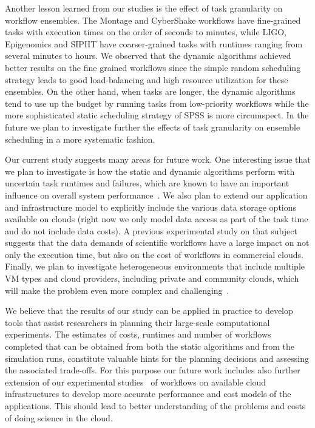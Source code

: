 \documentclass[conference]{IEEEtran}
\begin{document}
Another lesson learned from our studies is the effect of task granularity on
workflow ensembles. The Montage and CyberShake workflows have fine-grained tasks
with execution times on the order of seconds to minutes, while LIGO, Epigenomics
and SIPHT have coarser-grained tasks with runtimes ranging from several minutes
to hours. We observed that the dynamic algorithms achieved better results on the
fine grained workflows since the simple random scheduling strategy leads to good
load-balancing and high resource utilization for these ensembles. On the other
hand, when tasks are longer, the dynamic algorithms tend to use up the budget by
running tasks from low-priority workflows while the more sophisticated static
scheduling strategy of SPSS is more circumspect. In the future we plan to
investigate further the effects of task granularity on ensemble scheduling in a more
systematic fashion.

Our current study suggests many areas for future work. One interesting
issue that we plan to investigate is how the static and dynamic algorithms 
perform with uncertain task runtimes and failures, which are known to have 
an important influence on overall system performance~\cite{Sakellariou2010,Dongarra2007}. 
We also plan to extend our application and infrastructure model to explicitly 
include the various data storage options available on clouds (right now we only 
model data access as part of the task time and do not include data costs). A previous 
experimental study on that subject~\cite{Juve2010} suggests that the data 
demands of scientific workflows have a large impact on not only the 
execution time, but also on the cost of workflows in commercial clouds. 
Finally, we plan to investigate heterogeneous environments that include 
multiple VM types and cloud providers, including private and community clouds, 
which will make the problem even more complex and challenging~\cite{Marshall2010, Vockler2011, Juve2010}.

We believe that the results of our study can be applied in practice to develop 
tools that assist researchers in planning their large-scale computational
experiments. The estimates of costs, runtimes and number of workflows completed
that can be obtained from both the static algorithms and from the simulation
runs, constitute valuable hints for the planning decisions and assessing the
associated trade-offs. For this purpose our future work includes also further
extension of our experimental studies~\cite{Juve2009, Vockler2011} of workflows on
available cloud infrastructures to develop more accurate performance and cost
models of the applications. This should lead to better understanding of the
problems and costs of doing science in the cloud.



%





\end{document}
